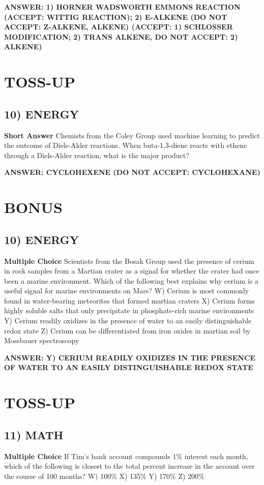 \documentclass{article}
\begin{document}
\textbf{ANSWER: 1) HORNER WADSWORTH EMMONS REACTION (ACCEPT: WITTIG REACTION); 2) E-ALKENE (DO NOT ACCEPT: Z-ALKENE, ALKENE) (ACCEPT: 1) SCHLOSSER MODIFICATION; 2) TRANS ALKENE, DO NOT ACCEPT: 2) ALKENE)}

\section*{TOSS-UP}
\subsection*{10) ENERGY}
\textbf{Short Answer} Chemists from the Coley Group used machine learning to predict the outcome of Diels-Alder reactions.
When buta-1,3-diene reacts with ethene through a Diels-Alder reaction, what is the major product?

\textbf{ANSWER: CYCLOHEXENE (DO NOT ACCEPT: CYCLOHEXANE)}

\section*{BONUS}
\subsection*{10) ENERGY}
\textbf{Multiple Choice} Scientists from the Bosak Group used the presence of cerium in rock samples from a Martian crater as a signal for whether the crater had once been a marine environment.
Which of the following best explains why cerium is a useful signal for marine environments on Mars?
W) Cerium is most commonly found in water-bearing meteorites that formed martian craters
X) Cerium forms highly soluble salts that only precipitate in phosphate-rich marine environments
Y) Cerium readily oxidizes in the presence of water to an easily distinguishable redox state
Z) Cerium can be differentiated from iron oxides in martian soil by Mossbauer spectroscopy

\textbf{ANSWER: Y) CERIUM READILY OXIDIZES IN THE PRESENCE OF WATER TO AN EASILY DISTINGUISHABLE REDOX STATE}

\section*{TOSS-UP}
\subsection*{11) MATH}
\textbf{Multiple Choice} If Tim's bank account compounds 1\% interest each month, which of the following is closest to the total percent increase in the account over the course of 100 months?
W) 100\%
X) 135\%
Y) 170\%
Z) 200\%
\end{document}

